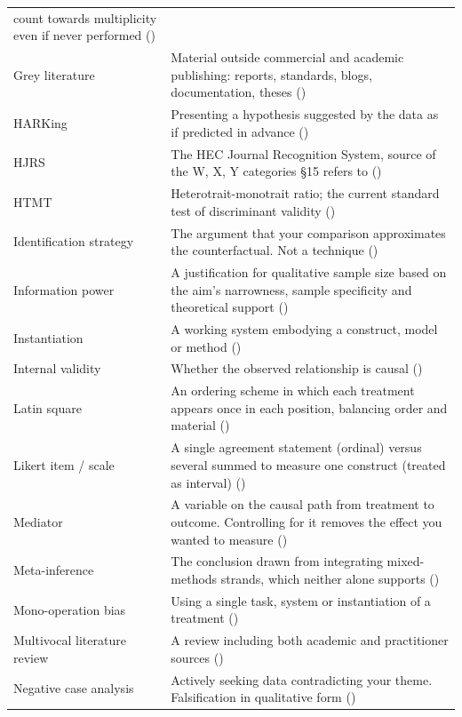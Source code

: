 \begin{center}
\begin{longtable}{@{}L{3.6cm}L{10.5cm}@{}}
  count towards multiplicity even if never performed () \\
Grey literature & Material outside commercial and academic publishing: reports,
  standards, blogs, documentation, theses () \\
HARKing & Presenting a hypothesis suggested by the data as if predicted in
  advance () \\
HJRS & The HEC Journal Recognition System, source of the W, X, Y categories
  \S15 refers to () \\
HTMT & Heterotrait-monotrait ratio; the current standard test of discriminant
  validity () \\
Identification strategy & The argument that your comparison approximates the
  counterfactual. Not a technique () \\
Information power & A justification for qualitative sample size based on the
  aim's narrowness, sample specificity and theoretical support
  () \\
Instantiation & A working system embodying a construct, model or method
  () \\
Internal validity & Whether the observed relationship is causal
  () \\
Latin square & An ordering scheme in which each treatment appears once in each
  position, balancing order and material () \\
Likert item / scale & A single agreement statement (ordinal) versus several
  summed to measure one construct (treated as interval)
  () \\
Mediator & A variable on the causal path from treatment to outcome. Controlling
  for it removes the effect you wanted to measure () \\
Meta-inference & The conclusion drawn from integrating mixed-methods strands,
  which neither alone supports () \\
Mono-operation bias & Using a single task, system or instantiation of a
  treatment () \\
Multivocal literature review & A review including both academic and
  practitioner sources () \\
Negative case analysis & Actively seeking data contradicting your theme.
  Falsification in qualitative form () \\

\end{longtable}
\end{center}
